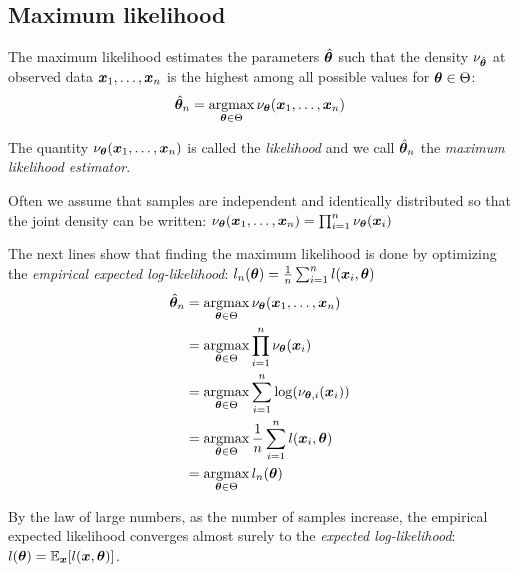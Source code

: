 \subsection{Maximum likelihood}
The maximum likelihood estimates the parameters $\hat{\boldsymbol{\theta}}$ such that the
density $\nu_{\hat{\boldsymbol{\theta}}}$ at observed data $\boldsymbol{x}_1, \dots, \boldsymbol{x}_n$ is the highest among all possible
values for $\boldsymbol{\theta} \in \Theta$:
\begin{align}
  \hat{\boldsymbol{\theta}}_n = \operatorname*{argmax}_{\boldsymbol{\theta} \in \Theta} \nu_{\boldsymbol{\theta}}(\boldsymbol{x}_1, \dots, \boldsymbol{x}_n)
\end{align}

The quantity $\nu_{\boldsymbol{\theta}}(\boldsymbol{x}_1, \dots, \boldsymbol{x}_n)$ is called the
\emph{likelihood} and we call $\hat{\boldsymbol{\theta}}_n$ the \emph{maximum likelihood estimator}.

Often we assume that samples are independent and identically distributed so that
the joint density can be written:
$\nu_{\boldsymbol{\theta}}(\boldsymbol{x}_1, \dots, \boldsymbol{x}_n) = \prod_{i=1}^n \nu_{\boldsymbol{\theta}}(\boldsymbol{x}_i)$

The next lines show that finding the maximum likelihood is done by optimizing
the \emph{empirical expected log-likelihood}: $l_n(\boldsymbol{\theta}) = \frac1n
\sum_{i=1}^n l(\boldsymbol{x}_i, \boldsymbol{\theta})$ 
\begin{align}
  \hat{\boldsymbol{\theta}}_n &= \operatorname*{argmax}_{\boldsymbol{\theta} \in \Theta} \nu_{\boldsymbol{\theta}}(\boldsymbol{x}_1, \dots, \boldsymbol{x}_n) \\
               &= \operatorname*{argmax}_{\boldsymbol{\theta} \in \Theta} \prod_{i=1}^n \nu_{\boldsymbol{\theta}}(\boldsymbol{x}_i) \\ 
               &= \operatorname*{argmax}_{\boldsymbol{\theta} \in \Theta} \sum_{i=1}^n \log(\nu_{\boldsymbol{\theta}, i}(\boldsymbol{x}_i))  \\
               &= \operatorname*{argmax}_{\boldsymbol{\theta} \in \Theta} \frac1n \sum_{i=1}^n l(\boldsymbol{x}_i, \boldsymbol{\theta}) \\ 
                  &= \operatorname*{argmax}_{\boldsymbol{\theta} \in \Theta} l_n(\boldsymbol{\theta}) \\ 
\end{align}

By the law of large numbers, as the number of samples increase, the empirical
expected likelihood converges almost surely to the \emph{expected
  log-likelihood}: $l(\boldsymbol{\theta}) = \mathbb{E}_{\boldsymbol{x}}[l(\boldsymbol{x}, \boldsymbol{\theta})]$.

